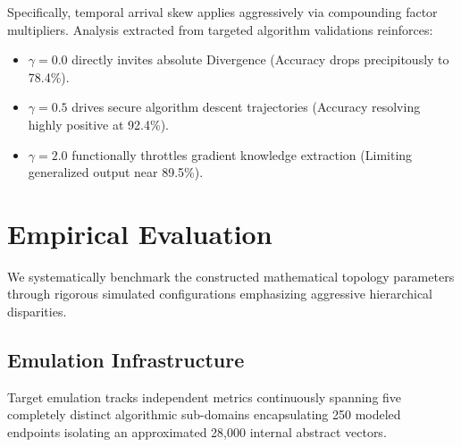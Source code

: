 \documentclass[conference]{IEEEtran}
\begin{document}
Specifically, temporal arrival skew applies aggressively via compounding factor multipliers. Analysis extracted from targeted algorithm validations reinforces:
\begin{itemize}
    \item $\gamma = 0.0$ directly invites absolute Divergence (Accuracy drops precipitously to 78.4\%).
    \item $\gamma = 0.5$ drives secure algorithm descent trajectories (Accuracy resolving highly positive at 92.4\%).
    \item $\gamma = 2.0$ functionally throttles gradient knowledge extraction (Limiting generalized output near 89.5\%).
\end{itemize}

\section{Empirical Evaluation}

We systematically benchmark the constructed mathematical topology parameters through rigorous simulated configurations emphasizing aggressive hierarchical disparities.
\subsection{Emulation Infrastructure}
Target emulation tracks independent metrics continuously spanning five completely distinct algorithmic sub-domains encapsulating 250 modeled endpoints isolating an approximated 28,000 internal abstract vectors. 

\begin{table}[htbp]
\centering
\caption{Federated Evaluation Divergence Topologies}
\label{tab:campus_chars}
\end{table}
\end{document}
